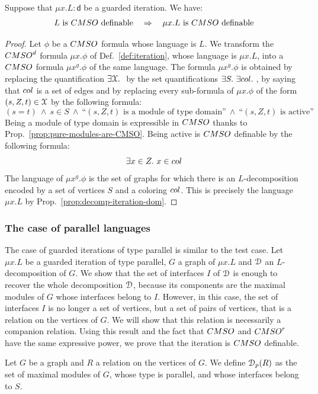 \begin{theorem} 
Suppose that $\mu x. L:\mathsf{d}$ be a guarded iteration. We have: 
$$ L\text{ is $\CMSO$ definable} \quad \Rightarrow \quad  \mu x.L \text{ is  $\CMSO$ definable}$$
\end{theorem}
\begin{proof} Let $\phi$ be a $\CMSO$ formula whose language is $L$.
We transform the $\CMSOd$ formula $\mu x. \phi$ of Def.~\ref{def:iteration}, whose language is $\mu x. L$, into a $\CMSO$ formula  $\mu x^g. \phi$ of the same language.  The formula $\mu x^g. \phi$ is obtained by replacing the quantification $\exists \mathcal X.\ $ by the set quantifications $\exists S.\ \exists \mathsf{\col}.\ $, by saying that $\col$ is a set of edges and by replacing every sub-formula of $\mu x. \phi$ of the form $(s,Z,t)\in \mathcal X$ by the following formula: 
$$(s=t) \ \wedge\ s\in S \ \wedge\ \text{``$(s,Z,t)$ is a module of type domain''} \ \wedge\  \text{``$(s,Z,t)$ is active''}$$
Being a module of type domain is expressible in $\CMSO$ thanks to Prop.~\ref{prop:pure-modules-are-CMSO}. Being active is  $\CMSO$ definable by the following formula:
$$ \exists x\in Z.\  x\in\col$$
The language of $\mu x^g. \phi$ is the set of graphs for which there is an $L$-decomposition encoded by a set of vertices $S$ and a coloring $\col$. This is precisely the language $\mu x. L$ by Prop.~\ref{prop:decomp-iteration-dom}.
\end{proof}

\subsubsection{The case of parallel languages}
The case of guarded iterations of type parallel is similar to the test case. Let $\mu x. L$ be a guarded iteration of type parallel, $G$ a graph of $\mu x. L$ and $\mathcal D$ an $L$-decomposition of $G$. We show that the set of interfaces $I$ of $\mathcal D$ is enough to recover the whole decomposition $\mathcal D$, because its components are the maximal modules of $G$ whose interfaces belong to $I$. However, in this case,  the set of interfaces $I$ is no longer a set of vertices, but a set of pairs of vertices, that is a relation on the vertices of $G$. We will show that this relation is necessarily a companion relation. Using this result and the fact that $\CMSO$ and $\CMSO^r$ have the same expressive power, we prove that the iteration is $\CMSO$ definable. 

\begin{definition}[$\cD_\mathsf{p}(R)$] Let $G$ be a graph and $R$ a relation on the vertices of $G$.   
We define $\cD_\mathsf{p}(R)$ as the set of maximal modules of $G$, whose type is parallel, and whose interfaces belong to $S$.  
\end{definition}

